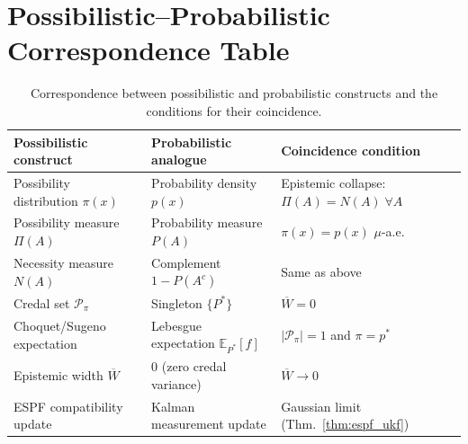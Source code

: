 \documentclass[12pt]{article}
\newcommand{\Ppi}{\mathcal{P}_\pi}
\begin{document}
\section{Possibilistic--Probabilistic Correspondence Table}
\label{app:table}

\begin{table}[h!]
\centering
\small
\caption{Correspondence between possibilistic and probabilistic constructs
and the conditions for their coincidence.}
\label{tab:correspondence}
\renewcommand{\arraystretch}{1.4}
\begin{tabular}{>{\raggedright}p{4.2cm}
                >{\raggedright}p{4.2cm}
                >{\raggedright\arraybackslash}p{5.2cm}}
\toprule
\textbf{Possibilistic construct} & \textbf{Probabilistic analogue}
& \textbf{Coincidence condition} \\
\midrule
Possibility distribution $\pi(x)$
  & Probability density $p(x)$
  & Epistemic collapse: $\Pi(A)=N(A)\;\forall A$ \\
Possibility measure $\Pi(A)$
  & Probability measure $P(A)$
  & $\pi(x)=p(x)$ $\mu$-a.e. \\
Necessity measure $N(A)$
  & Complement $1-P(A^c)$
  & Same as above \\
Credal set $\Ppi$
  & Singleton $\{P^*\}$
  & $\overline{W}=0$ \\
Choquet/Sugeno expectation
  & Lebesgue expectation $\mathbb{E}_{P^*}[f]$
  & $|\Ppi|=1$ and $\pi=p^*$ \\
Epistemic width $\overline{W}$
  & $0$ (zero credal variance)
  & $\overline{W}\to 0$ \\
ESPF compatibility update
  & Kalman measurement update
  & Gaussian limit (Thm.~\ref{thm:espf_ukf}) \\
\bottomrule
\end{tabular}
\end{table}
\end{document}
